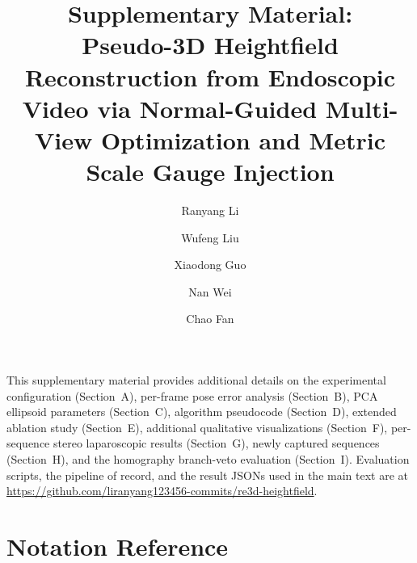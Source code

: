 \documentclass[review]{elsarticle}
\begin{document}
\begin{frontmatter}

\title{Supplementary Material:\\
Pseudo-3D Heightfield Reconstruction from Endoscopic Video via Normal-Guided Multi-View Optimization and Metric Scale Gauge Injection}

\author[1]{Ranyang Li}
\author[1]{Wufeng Liu}
\author[1]{Xiaodong Guo}
\author[2]{Nan Wei}
\author[1]{Chao Fan}
\address[1]{School of Artificial Intelligence and Big Data, Henan University of Technology, Zhengzhou 450001, China}
\address[2]{Henan Provincial People's Hospital, Zhengzhou University, Zhengzhou 450003, China}

\end{frontmatter}

This supplementary material provides additional details on the experimental configuration (Section~A), per-frame pose error analysis (Section~B), PCA ellipsoid parameters (Section~C), algorithm pseudocode (Section~D), extended ablation study (Section~E), additional qualitative visualizations (Section~F), per-sequence stereo laparoscopic results (Section~G), newly captured sequences (Section~H), and the homography branch-veto evaluation (Section~I). Evaluation scripts, the pipeline of record, and the result JSONs used in the main text are at \url{https://github.com/liranyang123456-commits/re3d-heightfield}.

\section*{Notation Reference}
\end{document}
